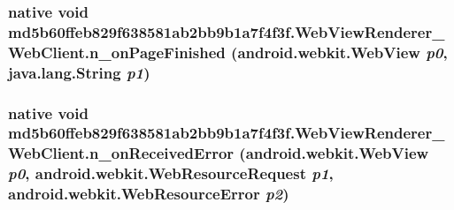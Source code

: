 \hypertarget{classmd5b60ffeb829f638581ab2bb9b1a7f4f3f_1_1_web_view_renderer___web_client_99db1c826929c2ed0f92fe4226fca37d}{
\subsubsection[{n\_\-onPageFinished}]{\setlength{\rightskip}{0pt plus 5cm}native void md5b60ffeb829f638581ab2bb9b1a7f4f3f.WebViewRenderer\_\-WebClient.n\_\-onPageFinished (android.webkit.WebView {\em p0}, \/  java.lang.String {\em p1})}}
\label{classmd5b60ffeb829f638581ab2bb9b1a7f4f3f_1_1_web_view_renderer___web_client_99db1c826929c2ed0f92fe4226fca37d}


\hypertarget{classmd5b60ffeb829f638581ab2bb9b1a7f4f3f_1_1_web_view_renderer___web_client_1d651253b298787466e21c00db593573}{
\subsubsection[{n\_\-onReceivedError}]{\setlength{\rightskip}{0pt plus 5cm}native void md5b60ffeb829f638581ab2bb9b1a7f4f3f.WebViewRenderer\_\-WebClient.n\_\-onReceivedError (android.webkit.WebView {\em p0}, \/  android.webkit.WebResourceRequest {\em p1}, \/  android.webkit.WebResourceError {\em p2})}}
\label{classmd5b60ffeb829f638581ab2bb9b1a7f4f3f_1_1_web_view_renderer___web_client_1d651253b298787466e21c00db593573}


